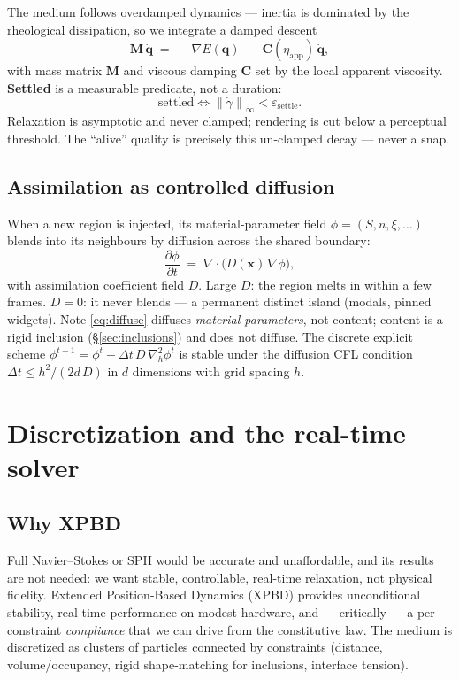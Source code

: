 \documentclass[11pt]{article}
\newcommand{\dt}{\Delta t}
\newcommand{\rate}{\dot{\gamma}}
\newcommand{\norm}[1]{\left\lVert #1 \right\rVert}
\begin{document}
The medium follows overdamped dynamics --- inertia is dominated by the rheological dissipation,
so we integrate a damped descent
\begin{equation}
\mathbf{M}\,\dot{\mathbf{q}} \;=\; -\nabla E(\mathbf{q}) \;-\; \mathbf{C}(\eta_{\text{app}})\,\dot{\mathbf{q}},
\end{equation}
with mass matrix $\mathbf{M}$ and viscous damping $\mathbf{C}$ set by the local apparent
viscosity. \textbf{Settled} is a measurable predicate, not a duration:
\begin{equation}
\text{settled} \iff \norm{\rate}_\infty < \varepsilon_{\text{settle}}.
\label{eq:settled}
\end{equation}
Relaxation is asymptotic and never clamped; rendering is cut below a perceptual threshold. The
``alive'' quality is precisely this un-clamped decay --- never a snap.

\subsection{Assimilation as controlled diffusion}\label{sec:assim}

When a new region is injected, its material-parameter field $\phi=(S,n,\xi,\dots)$ blends into
its neighbours by diffusion across the shared boundary:
\begin{equation}
\frac{\partial \phi}{\partial t} \;=\; \nabla\!\cdot\!\big(D(\mathbf{x})\,\nabla \phi\big),
\label{eq:diffuse}
\end{equation}
with assimilation coefficient field $D$. Large $D$: the region melts in within a few frames.
$D=0$: it never blends --- a permanent distinct island (modals, pinned widgets). Note
\eqref{eq:diffuse} diffuses \emph{material parameters}, not content; content is a rigid inclusion
(\S\ref{sec:inclusions}) and does not diffuse. The discrete explicit scheme
$\phi^{t+1}=\phi^t+\dt\,D\,\nabla_h^2\phi^t$ is stable under the diffusion CFL condition
$\dt \le h^2/(2d\,D)$ in $d$ dimensions with grid spacing $h$.

\section{Discretization and the real-time solver}\label{sec:xpbd}

\subsection{Why XPBD}
Full Navier--Stokes or SPH would be accurate and unaffordable, and its results are not needed:
we want stable, controllable, real-time relaxation, not physical fidelity. Extended
Position-Based Dynamics (XPBD) provides unconditional stability, real-time performance on modest
hardware, and --- critically --- a per-constraint \emph{compliance} that we can drive from the
constitutive law. The medium is discretized as clusters of particles connected by constraints
(distance, volume/occupancy, rigid shape-matching for inclusions, interface tension).
\end{document}
